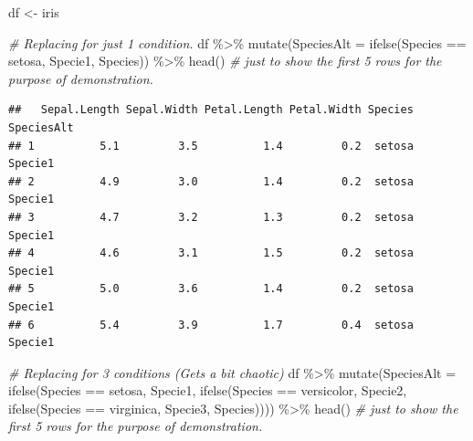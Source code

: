 \documentclass[
]{book}
\newenvironment{Shaded}{\begin{snugshade}}{\end{snugshade}}
\newcommand{\AttributeTok}[1]{\textcolor[rgb]{0.77,0.63,0.00}{#1}}
\newcommand{\CommentTok}[1]{\textcolor[rgb]{0.56,0.35,0.01}{\textit{#1}}}
\newcommand{\FunctionTok}[1]{\textcolor[rgb]{0.00,0.00,0.00}{#1}}
\newcommand{\NormalTok}[1]{#1}
\newcommand{\OtherTok}[1]{\textcolor[rgb]{0.56,0.35,0.01}{#1}}
\newcommand{\SpecialCharTok}[1]{\textcolor[rgb]{0.00,0.00,0.00}{#1}}
\newcommand{\StringTok}[1]{\textcolor[rgb]{0.31,0.60,0.02}{#1}}
\begin{document}
\begin{Shaded}
\begin{Highlighting}[]
\NormalTok{df }\OtherTok{\textless{}{-}}\NormalTok{ iris}

\CommentTok{\# Replacing for just 1 condition.}
\NormalTok{df }\SpecialCharTok{\%\textgreater{}\%} 
  \FunctionTok{mutate}\NormalTok{(}\AttributeTok{SpeciesAlt =} \FunctionTok{ifelse}\NormalTok{(Species }\SpecialCharTok{==} \StringTok{\textquotesingle{}setosa\textquotesingle{}}\NormalTok{, }\StringTok{\textquotesingle{}Specie1\textquotesingle{}}\NormalTok{, Species)) }\SpecialCharTok{\%\textgreater{}\%} 
  \FunctionTok{head}\NormalTok{()  }\CommentTok{\# just to show the first 5 rows for the purpose of demonstration.}
\end{Highlighting}
\end{Shaded}

\begin{verbatim}
##   Sepal.Length Sepal.Width Petal.Length Petal.Width Species SpeciesAlt
## 1          5.1         3.5          1.4         0.2  setosa    Specie1
## 2          4.9         3.0          1.4         0.2  setosa    Specie1
## 3          4.7         3.2          1.3         0.2  setosa    Specie1
## 4          4.6         3.1          1.5         0.2  setosa    Specie1
## 5          5.0         3.6          1.4         0.2  setosa    Specie1
## 6          5.4         3.9          1.7         0.4  setosa    Specie1
\end{verbatim}

\begin{Shaded}
\begin{Highlighting}[]
\CommentTok{\# Replacing for 3 conditions (Gets a bit chaotic)}
\NormalTok{df }\SpecialCharTok{\%\textgreater{}\%} 
  \FunctionTok{mutate}\NormalTok{(}\AttributeTok{SpeciesAlt =} \FunctionTok{ifelse}\NormalTok{(Species }\SpecialCharTok{==} \StringTok{\textquotesingle{}setosa\textquotesingle{}}\NormalTok{, }\StringTok{\textquotesingle{}Specie1\textquotesingle{}}\NormalTok{, }
                             \FunctionTok{ifelse}\NormalTok{(Species }\SpecialCharTok{==} \StringTok{\textquotesingle{}versicolor\textquotesingle{}}\NormalTok{, }\StringTok{\textquotesingle{}Specie2\textquotesingle{}}\NormalTok{,}
                                    \FunctionTok{ifelse}\NormalTok{(Species }\SpecialCharTok{==} \StringTok{\textquotesingle{}virginica\textquotesingle{}}\NormalTok{, }\StringTok{\textquotesingle{}Specie3\textquotesingle{}}\NormalTok{, Species)))) }\SpecialCharTok{\%\textgreater{}\%} 
  \FunctionTok{head}\NormalTok{()  }\CommentTok{\# just to show the first 5 rows for the purpose of demonstration.}
\end{Highlighting}
\end{Shaded}
\end{document}
